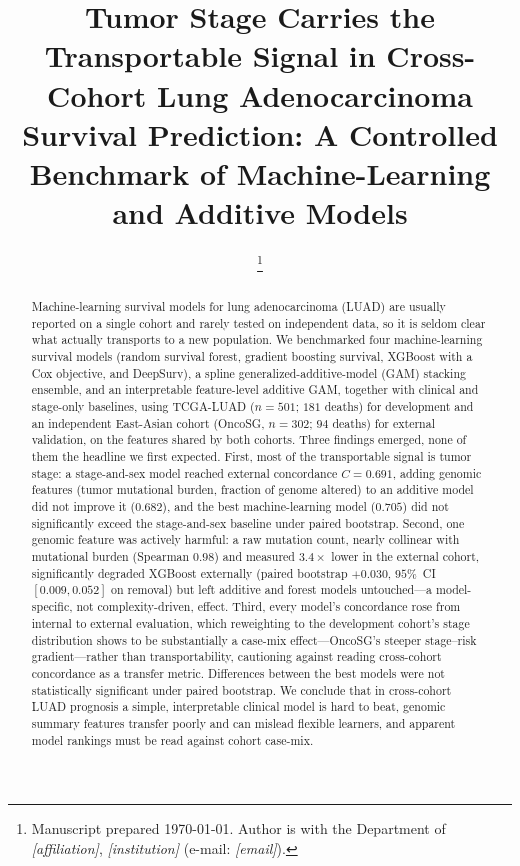 \documentclass[journal]{IEEEtran}
\begin{document}
\title{Tumor Stage Carries the Transportable Signal in Cross-Cohort Lung
Adenocarcinoma Survival Prediction: A Controlled Benchmark of Machine-Learning
and Additive Models}

\author{
  \thanks{Manuscript prepared \today. Author is with the Department of
  \emph{[affiliation]}, \emph{[institution]} (e-mail: \emph{[email]}).}%
}


\maketitle

\begin{abstract}
Machine-learning survival models for lung adenocarcinoma (LUAD) are usually
reported on a single cohort and rarely tested on independent data, so it is
seldom clear what actually transports to a new population. We benchmarked four
machine-learning survival models (random survival forest, gradient boosting
survival, XGBoost with a Cox objective, and DeepSurv), a spline
generalized-additive-model (GAM) stacking ensemble, and an interpretable
feature-level additive GAM, together with clinical and stage-only baselines,
using TCGA-LUAD ($n=501$; $181$ deaths) for development and an independent
East-Asian cohort (OncoSG, $n=302$; $94$ deaths) for external validation, on the
features shared by both cohorts. Three findings emerged, none of them the
headline we first expected. First, most of the transportable signal is
tumor stage: a stage-and-sex model reached external concordance $C=0.691$,
adding genomic features (tumor mutational burden, fraction of genome altered) to
an additive model did not improve it ($0.682$), and the best machine-learning
model ($0.705$) did not significantly exceed the stage-and-sex baseline under
paired bootstrap. Second, one genomic feature was
actively harmful: a raw mutation count, nearly collinear with mutational burden
(Spearman $0.98$) and measured $3.4\times$ lower in the external cohort,
significantly degraded XGBoost externally (paired bootstrap $+0.030$,
$95\%$~CI~$[0.009,0.052]$ on removal) but left additive and forest models
untouched---a model-specific, not complexity-driven, effect. Third, every
model's concordance rose from internal to external evaluation, which reweighting
to the development cohort's stage distribution shows to be substantially a
case-mix effect---OncoSG's steeper stage--risk gradient---rather than
transportability, cautioning against reading cross-cohort concordance as a
transfer metric. Differences between the best models were not statistically
significant under paired bootstrap. We conclude that in cross-cohort LUAD
prognosis a simple, interpretable clinical model is hard to beat, genomic
summary features transfer poorly and can mislead flexible learners, and
apparent model rankings must be read against cohort case-mix.
\end{abstract}
\end{document}
